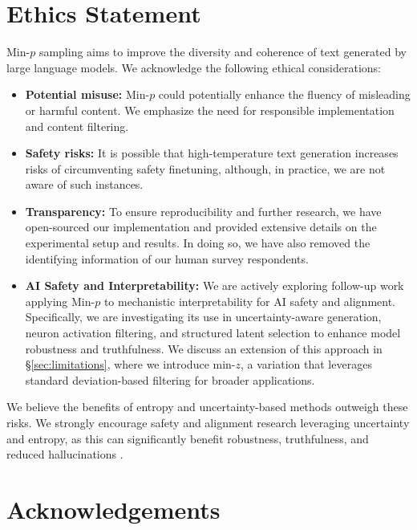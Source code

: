 \documentclass{article}
\begin{document}
\section*{Ethics Statement}

\noindent Min-\( p \) sampling aims to improve the diversity and coherence of text generated by large language models. We acknowledge the following ethical considerations:

\begin{itemize}

\item \textbf{Potential misuse:} Min-\( p \) could potentially enhance the fluency of misleading or harmful content. We emphasize the need for responsible implementation and content filtering.

\item \textbf{Safety risks:} It is possible that high-temperature text generation increases risks of circumventing safety finetuning, although, in practice, we are not aware of such instances.

\item \textbf{Transparency:} To ensure reproducibility and further research, we have open-sourced our implementation and provided extensive details on the experimental setup and results. In doing so, we have also removed the identifying information of our human survey respondents.

\item \textbf{AI Safety and Interpretability:} We are actively exploring follow-up work applying Min-\( p \) to mechanistic interpretability for AI safety and alignment. Specifically, we are investigating its use in uncertainty-aware generation, neuron activation filtering, and structured latent selection to enhance model robustness and truthfulness. We discuss an extension of this approach in \S\ref{sec:limitations}, where we introduce min-\( z \), a variation that leverages standard deviation-based filtering for broader applications.
\end{itemize}

\noindent We believe the benefits of entropy and uncertainty-based methods outweigh these risks. We strongly encourage safety and alignment research leveraging uncertainty and entropy, as this can significantly benefit robustness, truthfulness, and reduced hallucinations \citep{stolfo2024confidenceregulationneuronslanguage, wang2024chainofthoughtreasoningprompting}.

\section*{Acknowledgements}
\end{document}
